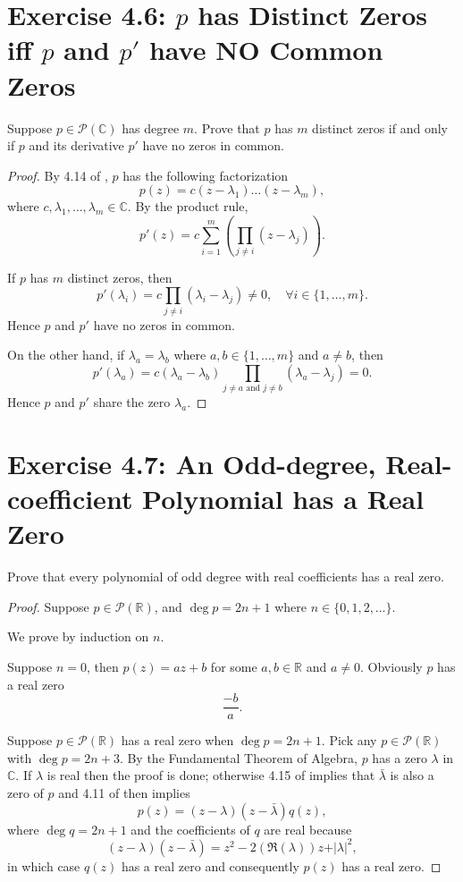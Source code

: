 \section{Exercise 4.6: $p$ has Distinct Zeros iff $p$ and $p'$ have NO Common Zeros}
Suppose $p\in\mathcal{P}(\mathbb{C})$ has degree $m$. Prove that $p$ has $m$ distinct zeros if and only if $p$ and its derivative $p'$ have no zeros in common.
\begin{proof}
By 4.14 of \cite{axler2014linear}, $p$ has the following factorization\[
p(z)=c(z-\lambda_1)\dots(z-\lambda_m),
\]where $c,\lambda_1,\dots,\lambda_m\in\mathbb{C}$. By the product rule,\[
p'(z)=c\sum_{i=1}^m\left(\prod_{j\ne i}(z-\lambda_j)\right).
\]

If $p$ has $m$ distinct zeros, then\[
p'(\lambda_i)=c\prod_{j\ne i}(\lambda_i-\lambda_j)\ne 0,\quad\forall i\in\{1,\dots,m\}.
\]Hence $p$ and $p'$ have no zeros in common.

On the other hand, if $\lambda_a=\lambda_b$ where $a,b\in\{1,\dots,m\}$ and $a\ne b$, then\[
p'(\lambda_a)=c(\lambda_a-\lambda_b)\prod_{j\ne a\text{ and }j\ne b}(\lambda_a-\lambda_j)=0.
\]Hence $p$ and $p'$ share the zero $\lambda_a$.
\end{proof}
\section{Exercise 4.7: An Odd-degree, Real-coefficient Polynomial has a Real Zero}\label{Exercise 4.A.7}
Prove that every polynomial of odd degree with real coefficients has a real zero.
\begin{proof}
Suppose $p\in\mathcal{P}(\mathbb{R})$, and $\deg p=2n+1$ where $n\in\{0,1,2,\dots\}$.

We prove by induction on $n$.

Suppose $n=0$, then $p(z)=az+b$ for some $a,b\in\mathbb{R}$ and $a\ne 0$. Obviously $p$ has a real zero\[
\frac{-b}{a}.
\]

Suppose $p\in\mathcal{P}(\mathbb{R})$ has a real zero when $\deg p=2n+1$. Pick any $p\in\mathcal{P}(\mathbb{R})$ with $\deg p=2n+3$. By the Fundamental Theorem of Algebra, $p$ has a zero $\lambda$ in $\mathbb{C}$. If $\lambda$ is real then the proof is done; otherwise 4.15 of \cite{axler2014linear} implies that $\bar\lambda$ is also a zero of $p$ and 4.11 of \cite{axler2014linear} then implies\[
p(z)=(z-\lambda)(z-\bar\lambda)q(z),
\]where $\deg q=2n+1$ and the coefficients of $q$ are real because\[
(z-\lambda)(z-\bar\lambda)=z^2-2(\Re(\lambda))z+\vert\lambda\vert^2,
\]in which case $q(z)$ has a real zero and consequently $p(z)$ has a real zero.
\end{proof}

